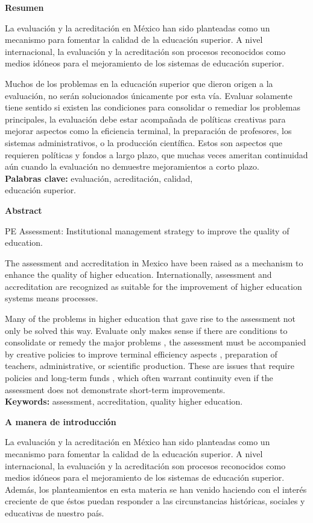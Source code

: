\bigskip
\textbf{Resumen}

La evaluación y la acreditación en México han sido planteadas como un mecanismo 
para fomentar la calidad de la educación superior. A nivel internacional, la 
evaluación y la acreditación son procesos reconocidos como medios idóneos para el
mejoramiento de los sistemas de educación superior.

Muchos de los problemas en la educación superior que dieron origen a la
evaluación, no serán solucionados  únicamente por esta vía. Evaluar
solamente tiene sentido si existen las condiciones para consolidar o
remediar los problemas principales, la evaluación debe estar acompañada de
políticas creativas para mejorar aspectos como la eficiencia terminal, la
preparación de profesores, los sistemas administrativos, o la producción
científica. Estos son aspectos que requieren políticas y fondos a largo
plazo, que muchas veces ameritan continuidad aún cuando la evaluación no
demuestre mejoramientos a corto plazo.\\ 
\textbf{Palabras clave:} evaluación, acreditación, calidad,\\ educación
superior.


\bigskip
\textbf{Abstract}

PE Assessment: Institutional management strategy to
improve the quality of education.

The assessment
and
accreditation in
Mexico
have been
raised
as a
mechanism to
enhance
the quality of
higher
education.
Internationally,
assessment and
accreditation are
recognized
as
suitable for
the
improvement of
higher
education systems
means
processes.

Many of the
problems
in higher
education
that gave
rise to
the
assessment not
  only 
  be
solved 
  this
way. 
  Evaluate 
  only 
  makes
sense if 
  there are
conditions to 
  consolidate 
  or
remedy 
  the major
  problems ,
the assessment must
  be
accompanied by 
  creative
policies 
  to
improve 
  terminal
efficiency 
  aspects ,
preparation of
  teachers, 
  administrative, 
  or 
  scientific
production. 
  These
are 
  issues
that require 
  policies
and 
  long-term
funds , which often
  warrant 
  continuity 
  even
if 
  the
assessment does not 
  demonstrate 
  short-term 
  improvements.\\
\textbf{Keywords:} assessment,
accreditation,
quality 
higher
education.
\newpage

\textbf{A manera de introducción}

La evaluación y la
acreditación en México han sido planteadas como un mecanismo para fomentar
la calidad de la educación superior. A nivel internacional, la evaluación y
la acreditación son procesos reconocidos como medios idóneos para el
mejoramiento de los sistemas de educación superior. Además, los
planteamientos en esta materia se han venido haciendo con el interés
creciente de que éstos puedan responder a las circunstancias históricas,
sociales y educativas de nuestro país.


